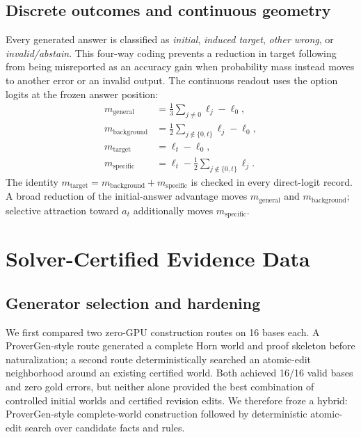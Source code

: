 \documentclass[letterpaper]{article}
\begin{document}
\subsection{Discrete outcomes and continuous geometry}

Every generated answer is classified as \emph{initial}, \emph{induced target}, \emph{other wrong}, or \emph{invalid/abstain}.  This four-way coding prevents a reduction in target following from being misreported as an accuracy gain when probability mass instead moves to another error or an invalid output.  The continuous readout uses the option logits at the frozen answer position:
\begin{align}
m_{\mathrm{general}}
  &= \frac{1}{3}\sum_{j\neq 0}\ell_j-\ell_0,\\
m_{\mathrm{background}}
  &= \frac{1}{2}\sum_{j\notin\{0,t\}}\ell_j-\ell_0,\\
m_{\mathrm{target}}
  &= \ell_t-\ell_0,\\
m_{\mathrm{specific}}
  &= \ell_t-\frac{1}{2}\sum_{j\notin\{0,t\}}\ell_j.
\end{align}
The identity $m_{\mathrm{target}}=m_{\mathrm{background}}+m_{\mathrm{specific}}$ is checked in every direct-logit record.  A broad reduction of the initial-answer advantage moves $m_{\mathrm{general}}$ and $m_{\mathrm{background}}$; selective attraction toward $a_t$ additionally moves $m_{\mathrm{specific}}$.

\section{Solver-Certified Evidence Data}
\label{supp:data}

\subsection{Generator selection and hardening}

We first compared two zero-GPU construction routes on 16 bases each.  A ProverGen-style route generated a complete Horn world and proof skeleton before naturalization; a second route deterministically searched an atomic-edit neighborhood around an existing certified world.  Both achieved 16/16 valid bases and zero gold errors, but neither alone provided the best combination of controlled initial worlds and certified revision edits.  We therefore froze a hybrid: ProverGen-style complete-world construction followed by deterministic atomic-edit search over candidate facts and rules.
\end{document}
